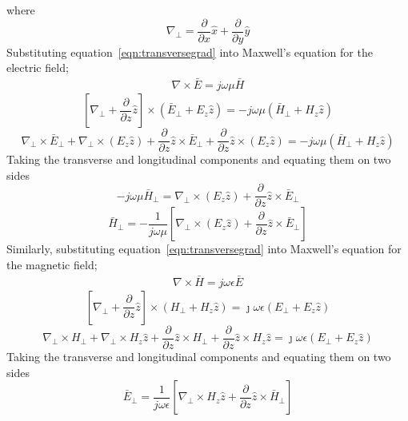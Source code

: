 where
\begin{equation*}
\nabla_\bot = \frac{\partial}{\partial x}\hat{x} + \frac{\partial}{\partial y}\hat{y}
\end{equation*}
Substituting equation~\ref{eqn:transversegrad} into Maxwell's equation for the electric field;
\begin{align*}
\nabla\times\bar{E} = j\omega\mu\bar{H}
\end{align*}
\begin{dmath*}
\left[\nabla_\bot + \frac{\partial}{\partial z}\hat{z}\right]\times(\bar{E}_\bot + E_z\hat{z}) = -j\omega\mu(\bar{H}_\bot + H_z\hat{z})
\end{dmath*}
\begin{dmath*}
\nabla_\bot\times\bar{E}_\bot + \nabla_\bot\times(E_z\hat{z}) + \frac{\partial}{\partial z}\hat{z}\times\bar{E}_\bot + \frac{\partial}{\partial z}\hat{z}\times(E_z\hat{z}) = -j\omega\mu(\bar{H}_\bot + H_z\hat{z})
\end{dmath*}
Taking the transverse and longitudinal components and equating them on two sides
\begin{dmath*}
-j\omega\mu\bar{H}_\bot = \nabla_\bot\times(E_z\hat{z}) + \frac{\partial}{\partial z}\hat{z}\times\bar{E}_\bot
\end{dmath*}
\begin{dmath}
\bar{H}_\bot = -\frac{1}{j\omega\mu} \left[\nabla_\bot\times(E_z\hat{z}) + \frac{\partial}{\partial z}\hat{z}\times\bar{E}_\bot\right]
\label{eqn:transversemag}
\end{dmath}
Similarly, substituting equation~\ref{eqn:transversegrad}  into Maxwell's equation for the magnetic field;
\begin{align*}
\nabla\times\bar{H} = j\omega\epsilon\bar{E}
\end{align*}
\begin{dmath*}
\left[ \nabla_\bot + \frac{\partial}{\partial z}\hat{z} \right] \times (H_\bot + H_z \hat{z}) = \jmath \omega\epsilon (E_\bot + E_z \hat{z})
\end{dmath*}
\begin{dmath*}
\nabla_\bot\times H_\bot + \nabla_\bot\times H_z \hat{z} +  \frac{\partial}{\partial z}\hat{z}\times H_\bot + \frac{\partial}{\partial z}\hat{z}\times H_z \hat{z} = \jmath \omega\epsilon (E_\bot + E_z \hat{z})
\end{dmath*}
Taking the transverse and longitudinal components and equating them on two sides
\begin{dmath}
\bar{E}_\bot = \frac{1}{j\omega\epsilon} \left[\nabla_\bot\times H_z\hat{z} + \frac{\partial}{\partial z}\hat{z}\times\bar{H}_\bot\right]
\label{eqn:transverseele}
\end{dmath}
